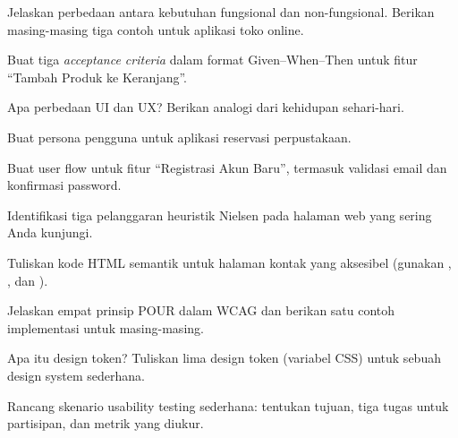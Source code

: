 \documentclass[../main.tex]{subfiles}
\begin{document}
\begin{latihan}
  \item Jelaskan perbedaan antara kebutuhan fungsional dan non-fungsional. Berikan masing-masing tiga contoh untuk aplikasi toko online.
  \item Buat tiga \textit{acceptance criteria} dalam format Given--When--Then untuk fitur ``Tambah Produk ke Keranjang''.
  \item Apa perbedaan UI dan UX? Berikan analogi dari kehidupan sehari-hari.
  \item Buat persona pengguna untuk aplikasi reservasi perpustakaan.
  \item Buat user flow untuk fitur ``Registrasi Akun Baru'', termasuk validasi email dan konfirmasi password.
  \item Identifikasi tiga pelanggaran heuristik Nielsen pada halaman web yang sering Anda kunjungi.
  \item Tuliskan kode HTML semantik untuk halaman kontak yang aksesibel (gunakan , , dan ).
  \item Jelaskan empat prinsip POUR dalam WCAG dan berikan satu contoh implementasi untuk masing-masing.
  \item Apa itu design token? Tuliskan lima design token (variabel CSS) untuk sebuah design system sederhana.
  \item Rancang skenario usability testing sederhana: tentukan tujuan, tiga tugas untuk partisipan, dan metrik yang diukur.
\end{latihan}
\end{document}

